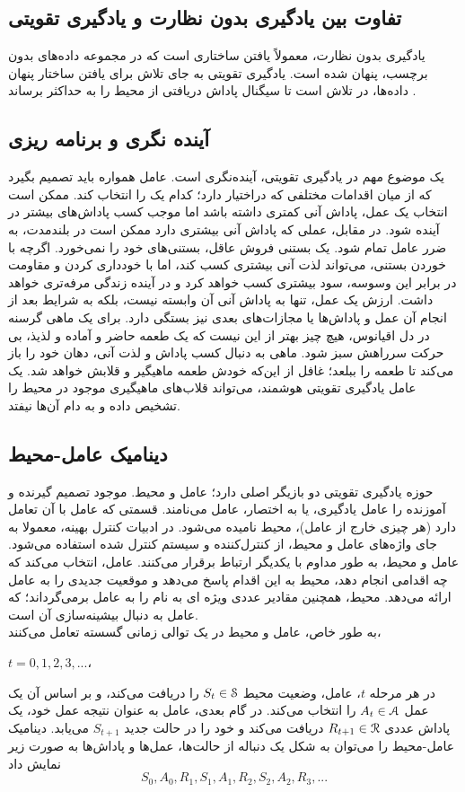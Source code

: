 \subsection*{تفاوت بین یادگیری بدون نظارت و یادگیری تقویتی}
یادگیری بدون نظارت، معمولاً یافتن ساختاری است که در مجموعه داده‌های بدون برچسب، پنهان شده است. یادگیری تقویتی به جای تلاش برای یافتن ساختار پنهان داده‌ها، در تلاش است تا سیگنال پاداش دریافتی از محیط را به حداکثر برساند
\cite{suttonbook}.
\subsection{آینده نگری و برنامه ریزی}
یک موضوع مهم در یادگیری تقویتی، آینده‌نگری است. عامل همواره باید تصمیم بگیرد که از میان اقدامات مختلفی که دراختیار دارد؛ کدام یک را انتخاب کند. ممکن است انتخاب یک عمل، پاداش آنی کمتری داشته باشد اما موجب کسب پاداش‌های بیشتر در آینده شود. در مقابل، عملی که پاداش آنی بیشتری دارد ممکن است در بلند‌مدت، به ضرر عامل تمام شود.  یک بستنی فروش عاقل، بستنی‌های خود را نمی‌خورد. اگرچه با خوردن بستنی، می‌تواند لذت  آنی بیشتری کسب کند، اما با خودداری کردن و مقاومت در برابر این وسوسه، سود بیشتری کسب ‌خواهد کرد و در آینده زندگی مرفه‌تری خواهد داشت.
ارزش یک عمل، تنها به پاداش آنی آن وابسته نیست، بلکه به شرایط بعد از انجام آن عمل و پاداش‌ها یا مجازات‌های بعدی نیز بستگی دارد. برای یک ماهی گرسنه در دل اقیانوس، هیچ چیز بهتر از این نیست که یک طعمه حاضر و آماده و لذیذ، بی حرکت سرراهش سبز شود. ماهی به دنبال کسب پاداش و لذت آنی، دهان خود را باز می‌کند تا طعمه را ببلعد؛ غافل از این‌که خودش طعمه ماهیگیر و قلابش خواهد شد. یک عامل یادگیری تقویتی هوشمند، می‌تواند قلاب‌های ماهیگیری موجود در محیط را تشخیص داده و به دام آن‌ها نیفتد.
\subsection{دینامیک عامل-محیط}
حوزه یادگیری تقویتی  دو بازیگر اصلی دارد؛ عامل و محیط. موجود تصمیم گیرنده و آموزنده را عامل یادگیری، یا به اختصار، عامل می‌نامند. قسمتی که عامل با آن تعامل دارد (هر چیزی خارج از عامل)، محیط نامیده می‌شود. در ادبیات کنترل بهینه، معمولا به جای واژه‌های عامل و محیط، از  کنترل‌کننده 
و سیستم کنترل شده  استفاده می‌شود.
عامل و محیط، به طور مداوم با یکدیگر ارتباط برقرار می‌کنند. عامل، انتخاب می‌کند که چه اقدامی‌ انجام دهد، محیط به این اقدام پاسخ می‌دهد و موقعیت جدیدی را به عامل ارائه می‌دهد.
محیط، همچنین مقادیر عددی ویژه ای به نام  را به عامل برمی‌گرداند؛ که عامل به دنبال بیشینه‌سازی آن است.
\\به طور خاص، عامل و محیط در یک توالی زمانی گسسته تعامل می‌کنند، 
\begin{latin}$t = 0,1,2,3,...$،\end{latin}
در هر مرحله $t$، عامل، وضعیت محیط $S_t \in \EuScript{S}$
را دریافت می‌کند، و بر اساس آن یک عمل 
$A_t \in \EuScript{A}$
را انتخاب می‌کند. در گام بعدی، عامل به عنوان نتیجه عمل خود، یک پاداش عددی $R_{t+1} \in \EuScript{R}$ دریافت می‌کند و خود را در حالت جدید $S_{t+1}$ می‌یابد\cite{suttonbook}.
دینامیک عامل-محیط را می‌توان به شکل یک دنباله از حالت‌ها، عمل‌ها و پاداش‌ها به صورت زیر نمایش داد
$$S_0, A_0, R_1, S_1, A_1, R_2, S_2, A_2, R_3,...$$
